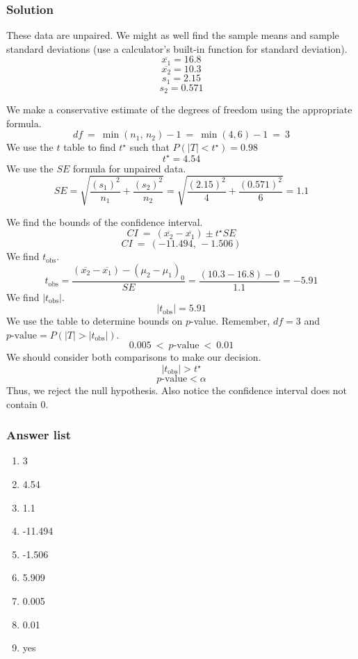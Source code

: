 \documentclass[11pt,containsverbatim,handout]{beamer}
\begin{document}
\begin{frame} \small
\frametitle{Solution}
These data are unpaired. We might as well find the sample means and
sample standard deviations (use a calculator's built-in function for
standard deviation). \pause \[\overline{x_1} = 16.8 \]
\[\overline{x_2} = 10.3 \] \[s_1 = 2.15 \] \[s_2 = 0.571 \] \pause

We make a conservative estimate of the degrees of freedom using the
appropriate formula. \pause \[df ~=~ \min(n_1,\,n_2)-1 ~=~ \min(4,6)-1 ~=~ 3 \] \pause
We use the \(t\) table to find \(t^\star\) such that
\(P(|T|<t^\star) = 0.98\) \[t^\star = 4.54 \] We use the \(SE\) formula
for unpaired data. \pause
\[SE = \sqrt{\frac{(s_1)^2}{n_1}+\frac{(s_2)^2}{n_2}} =
\sqrt{\frac{(2.15)^2}{4}+\frac{(0.571)^2}{6}} = 1.1 \] 
\end{frame}

\begin{frame} \small
We find the
bounds of the confidence interval. \pause
\[CI ~=~ (\overline{x_2}-\overline{x_1})\pm t^{\star} SE\]
\[CI ~=~ (-11.494,\, -1.506) \] 
We find \(t_\text{obs}\). \pause
\[t_\text{obs} = \frac{(\overline{x_2}-\overline{x_1})-(\mu_2-\mu_1)_0}{SE} = \frac{(10.3-16.8)-0}{1.1} = -5.91\] \pause
We find \(|t_\text{obs}|\). \pause
\[|t_\text{obs}| = 5.91 \] \pause
We use the table to determine bounds on \(p\)-value. Remember, \(df=3\) and \(p\text{-value} = P(|T|>|t_\text{obs}|)\). \pause
\[0.005 ~<~ p\text{-value} ~<~ 0.01\] \pause
We should consider both comparisons to make our decision.\pause
 \[|t_\text{obs}| > t^{\star} \]
\[p\text{-value} < \alpha \] 
\pause
Thus, we reject the null hypothesis. Also
notice the confidence interval does not contain 0.
\end{frame}

\begin{frame}
\frametitle{Answer list}
\begin{enumerate}
  \item 3
  \item 4.54
  \item 1.1
  \item -11.494
  \item -1.506
  \item 5.909
  \item 0.005
  \item 0.01
  \item yes
\end{enumerate}
\end{frame}
\end{document}
